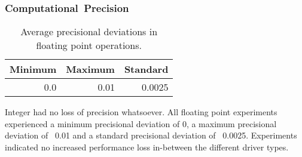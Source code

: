 \documentclass[fleqn,10pt]{SelfArx} %
\begin{document}
\subsubsection{Computational~Precision}
\label{sec:contribution:results:computationalprecision}
\begin{table}
\begin{center}
	\begin{tabular}{|r|r|r|}
		\hline
		\textbf{Minimum} 	& \textbf{Maximum} 	& \textbf{Standard} 	\\ \hline
		0.0     			& ~0.01   			& ~0.0025            		\\ \hline
	\end{tabular}
\label{tab:contribution:results:computationalprecision:avgprecision}
\caption {Average precisional deviations in floating point operations.}
\end{center}
\end{table}

Integer had no loss of precision whatsoever.
All floating point experiments experienced a minimum precisional deviation of 0, a maximum precisional deviation of ~0.01 and a standard precisional deviation of ~0.0025. Experiments indicated no increased performance loss in-between the different driver types.

\end{document}

